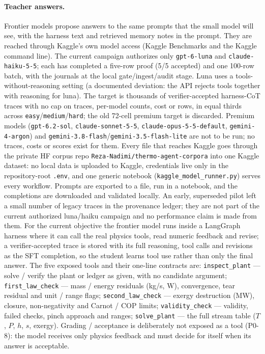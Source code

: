 \paragraph{Teacher answers.}
Frontier models propose answers to the same prompts that the small model will see, with the harness text and retrieved memory notes in the prompt. They are reached through Kaggle's own model access (Kaggle Benchmarks and the Kaggle command line). The current campaign authorizes only \texttt{gpt-6-luna} and \texttt{claude-haiku-5-5}; each has completed a five-row proof (5/5 accepted) and one 100-row batch, with the journals at the local gate/ingest/audit stage. Luna uses a tools-without-reasoning setting (a documented deviation: the API rejects tools together with reasoning for luna). The target is thousands of verifier-accepted harness-CoT traces with no cap on traces, per-model counts, cost or rows, in equal thirds across \texttt{easy}/\texttt{medium}/\texttt{hard}; the old 72-cell premium target is discarded. Premium models (\texttt{gpt-6.2-sol}, \texttt{claude-sonnet-5-5}, \texttt{claude-opus-5-5-default}, \texttt{gemini-4-argon}) and \texttt{gemini-3.8-flash}/\texttt{gemini-3.5-flash-lite} are not to be run; no traces, costs or scores exist for them. Every file that reaches Kaggle goes through the private HF corpus repo \texttt{Reza-Nadimi/thermo-agent-corpora} into one Kaggle dataset: no local data is uploaded to Kaggle, credentials live only in the repository-root \texttt{.env}, and one generic notebook (\texttt{kaggle\_model\_runner.py}) serves every workflow. Prompts are exported to a file, run in a notebook, and the completions are downloaded and validated locally. An early, superseded pilot left a small number of legacy traces in the provenance ledger; they are not part of the current authorized luna/haiku campaign and no performance claim is made from them. For the current objective the frontier model runs inside a LangGraph harness where it can call the real physics tools, read numeric feedback and revise; a verifier-accepted trace is stored with its full reasoning, tool calls and revisions as the SFT completion, so the student learns tool use rather than only the final answer. The five exposed tools and their one-line contracts are: \texttt{inspect\_plant} --- solve / verify the plant or ledger as given, with no candidate argument; \texttt{first\_law\_check} --- mass / energy residuals (kg/s, W), convergence, tear residual and unit / range flags; \texttt{second\_law\_check} --- exergy destruction (MW), closure, non-negativity and Carnot / COP limits; \texttt{validity\_check} --- validity, failed checks, pinch approach and ranges; \texttt{solve\_plant} --- the full stream table ($T$, $P$, $h$, $s$, exergy). Grading / acceptance is deliberately not exposed as a tool (P0-8): the model receives only physics feedback and must decide for itself when its answer is acceptable.
